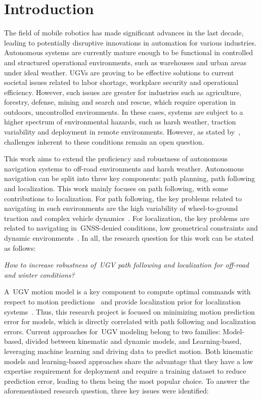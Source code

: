 \documentclass[12pt,letterpaper,oneside]{article}
\begin{document}
\makeCustomTitle
\thispagestyle{titlePage}


\section{Introduction}
\label{sec:introduction}

The field of mobile robotics has made significant advances in the last decade, leading to potentially disruptive innovations in automation for various industries.
Autonomous systems are currently mature enough to be functional in controlled and structured operational environments, such as warehouses and urban areas under ideal weather.
\acp{UGV} are proving to be effective solutions to current societal issues related to labor shortage, workplace security and operational efficiency. 
However, such issues are greater for industries such as agriculture, forestry, defense, mining and search and rescue,  which require operation in outdoors, uncontrolled environments.
In these cases, systems are subject to a higher spectrum of environmental hazards, such as harsh weather, traction variability and deployment in remote environments.
However, as stated by~\citet{VanBrummelen2018}, challenges inherent to these conditions remain an open question.

This work aims to extend the proficiency and robustness of autonomous navigation systems to off-road environments and harsh weather. 
Autonomous navigation can be split into three key components: path planning, path following and localization. 
This work mainly focuses on path following, with some contributions to localization.
For path following, the key problems related to navigating in such environments are the high variability of wheel-to-ground traction and complex vehicle dynamics~\citep{Baril2020}.
For localization, the key problems are related to navigating in~\ac{GNSS}-denied conditions, low geometrical constraints and dynamic environments~\citep{Baril2022}.
In all, the research question for this work can be stated as follows:

\begin{center}
	\emph{
		How to increase robustness of~\ac{UGV} path following and localization for off-road and winter conditions?
	}
\end{center}

A~\ac{UGV} motion model is a key component to compute optimal commands with respect to motion predictions~\citep{Brunke2022} and provide localization prior for localization systems~\citep{Dumbgen2023}. 
Thus, this research project is focused on minimizing motion prediction error for models, which is directly correlated with path following and localization errors. 
Current approaches for~\ac{UGV} modeling belong to two families: Model-based, divided between kinematic and dynamic models, and Learning-based, leveraging machine learning and driving data to predict motion.
Both kinematic models and learning-based approaches share the advantage that they have a low expertise requirement for deployment and require a training dataset to reduce prediction error, leading to them being the most popular choice.
To answer the aforementioned research question, three key issues were identified:
\end{document}
